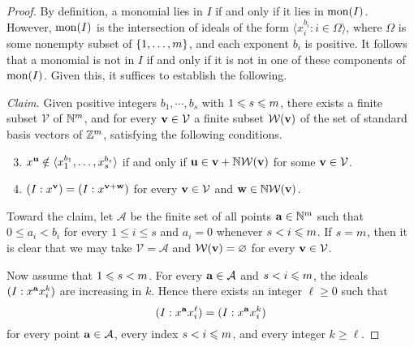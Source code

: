 \documentclass[11pt]{amsart}
\begin{document}
\begin{proof}  By definition, a monomial lies in $I$ if and only if it lies in $\operatorname{mon}(I)$.  However, $\operatorname{mon}(I)$ is the intersection of ideals of the form $\langle x_i^{b_i} : i \in \Omega \rangle$, where $\Omega$ is some nonempty subset of $\{ 1, \ldots, m \}$, and each exponent $b_i$ is positive.   It follows that a monomial is not in $I$ if and only if it is not in one of these components of $\operatorname{mon}(I)$.  Given this, it suffices to establish the following.

\vspace{.2cm}

\noindent \emph{Claim.} Given positive integers  $b_1, \cdots, b_{s}$ with $1 \leqslant s \leqslant m$, there exists a finite subset $\mathcal{V}$ of $\mathbb{N}^m$, and for every $\mathbf{v} \in \mathcal{V}$ a finite subset $\mathcal{W}(\mathbf{v})$ of the set of standard basis vectors of $\mathbb{Z}^m$,  satisfying the following conditions.
\begin{enumerate}
\setcounter{enumi}{2}
\item \label{stab-1: e} $x^{\mathbf{u}} \notin \langle x_1^{b_1}, \ldots, x_{s}^{b_{s}} \rangle $ if and only if $\mathbf{u} \in \mathbf{v} + \mathbb{N} \mathcal{W}(\mathbf{v})$ for some $\mathbf{v} \in \mathcal{V}$.
\item \label{stab-2: e} $(I:x^{\mathbf{v}}) = (I: x^{\mathbf{v}+\mathbf{w}})$ for every $\mathbf{v} \in \mathcal{V}$ and $\mathbf{w} \in  \mathbb{N}  \mathcal{W}(\mathbf{v})$.
\end{enumerate}

\vspace{.15cm}


Toward the claim, let $\mathcal{A}$ be the finite set of all points $\mathbf{a} \in \mathbb{N}^m$ such that $0 \leq a_i < b_i$ for every $1 \leq i \leq s$ and $a_i = 0$ whenever $s < i \leqslant m$.  If $s = m$, then it is clear that we may take $\mathcal{V} = \mathcal{A}$ and $\mathcal{W}(\mathbf{v}) = \varnothing$ for every $\mathbf{v} \in \mathcal{V}$.

Now assume that $1 \leqslant s < m$.
For every $\mathbf{a} \in \mathcal{A}$ and $s < i \leqslant m$, the ideals $(I: x^{\mathbf{a}} x_i^k)$ are increasing in $k$.  Hence there exists an integer $\ell \geq 0$ such that
\begin{equation}
\label{colon-simple: e}
(I: x^{\mathbf{a}}x_i^\ell) = (I: x^{\mathbf{a}}x_i^k)
\end{equation}
for every point $\mathbf{a} \in \mathcal{A}$, every index $s < i \leqslant m$, and every integer $k \geq \ell$.



\end{proof}
\end{document}
